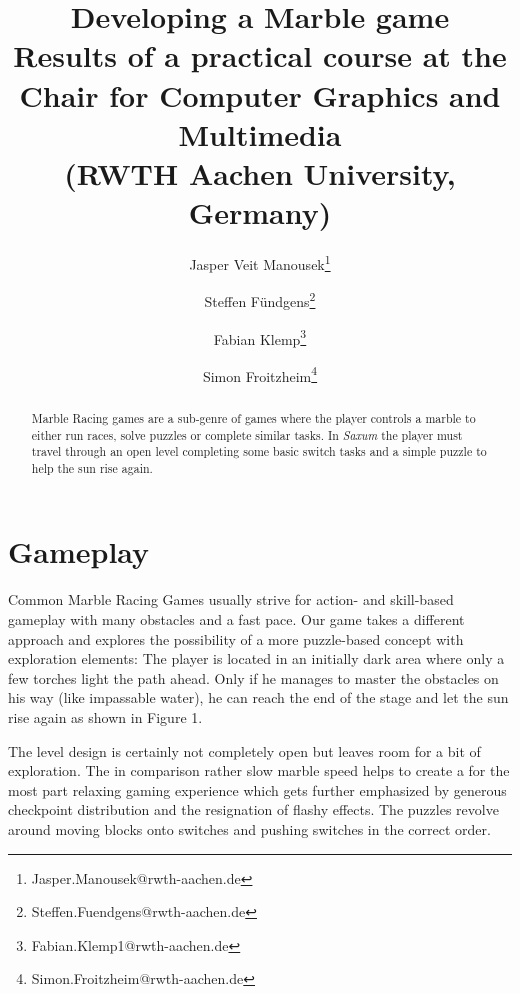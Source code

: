 \documentclass[sponsored]{acmsiggraph}
\title{Developing a Marble game \\ \large \normalfont Results of a practical
course at the Chair for Computer Graphics and Multimedia \\ (RWTH Aachen
University, Germany)}
\author{Jasper Veit Manousek\thanks{Jasper.Manousek@rwth-aachen.de} 
\and    Steffen F\"undgens\thanks{Steffen.Fuendgens@rwth-aachen.de} 
\and    Fabian Klemp\thanks{Fabian.Klemp1@rwth-aachen.de} 
\and    Simon Froitzheim\thanks{Simon.Froitzheim@rwth-aachen.de} }
\begin{document}

\maketitle

\begin{abstract}

Marble Racing games are a sub-genre of games where the player controls a marble to either run races, solve puzzles or complete similar tasks. In \textit{Saxum} the player must travel through an open level completing some basic switch tasks and a simple puzzle to help the sun rise again.
 
\end{abstract}

\section{Gameplay}
Common Marble Racing Games usually strive for action- and skill-based gameplay with many obstacles and a fast pace. Our game takes a different approach and explores the possibility of a more puzzle-based concept with exploration elements: The player is located in an initially dark 
area where only a few torches light the path ahead. Only if he manages to master the obstacles on his way (like impassable water), he can reach the end of the stage and let the sun rise again as shown in Figure 1.

The level design is certainly not completely open but leaves room for a bit of exploration. The in comparison rather slow marble speed helps to create a for the most part relaxing gaming experience which gets further emphasized by generous checkpoint distribution and the resignation of flashy effects. The puzzles revolve around moving blocks onto switches and pushing switches in the correct order.
\end{document}
